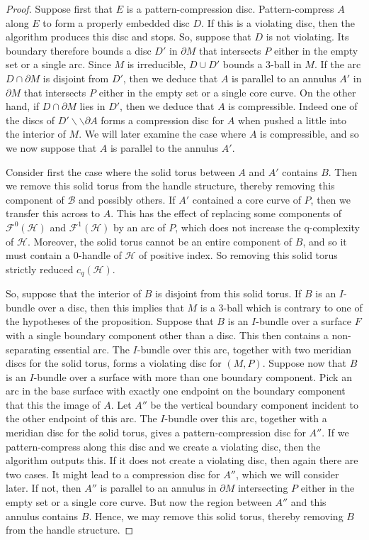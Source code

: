 \documentclass[oneside]{amsart}
\numberwithin{equation}{section}
\theoremstyle{plain}
\theoremstyle{definition}
\newcommand{\cut}{\backslash\backslash}
\begin{document}
\begin{proof}
Suppose first that $E$ is a pattern-compression disc. Pattern-compress $A$ along $E$ to form a properly embedded disc $D$. If this is a violating disc, then the algorithm produces this disc and stops. So, suppose that $D$ is not violating. Its boundary therefore bounds a disc $D'$ in $\partial M$ that intersects $P$ either in the empty set or a single arc. Since $M$ is irreducible, $D \cup D'$ bounds a 3-ball in $M$. If the arc $D \cap \partial M$ is disjoint from $D'$, then we deduce that $A$ is parallel to an annulus $A'$ in $\partial M$ that intersects $P$ either in the empty set or a single core curve. On the other hand, if $D \cap \partial M$ lies in $D'$, then we deduce that $A$ is compressible. Indeed one of the discs of $D' \cut \partial A$ forms a compression disc for $A$ when pushed a little into the interior of $M$. We will later examine the case where $A$ is compressible, and so we now suppose that $A$ is parallel to the annulus $A'$.

Consider first the case where the solid torus between $A$ and $A'$ contains $B$. Then we remove this solid torus from the handle structure, thereby removing this component of $\mathcal{B}$ and possibly others. If $A'$ contained a core curve of $P$, then we transfer this across to $A$. This has the effect of replacing some components of $\mathcal{F}^0(\mathcal{H})$ and $\mathcal{F}^1(\mathcal{H})$ by an arc of $P$, which does not increase the q-complexity of $\mathcal{H}$. Moreover, the solid torus cannot be an entire component of $B$, and so it must contain a 0-handle of $\mathcal{H}$ of positive index. So removing this solid torus strictly reduced $c_q(\mathcal{H})$.

So, suppose that the interior of $B$ is disjoint from this solid torus. If $B$ is an $I$-bundle over a disc, then this implies that $M$ is a 3-ball which is contrary to one of the hypotheses of the proposition. 
Suppose that $B$ is an $I$-bundle over a surface $F$ with a single boundary component other than a disc. This then contains a non-separating essential arc. The $I$-bundle over this arc, together with two meridian discs for the solid torus, forms a violating disc for $(M,P)$. Suppose now that $B$ is an $I$-bundle over a surface with more than one boundary component. Pick an arc in the base surface with exactly one endpoint on the boundary component that this the image of $A$. Let $A''$ be the vertical boundary component incident to the other endpoint of this arc. The $I$-bundle over this arc, together with a meridian disc for the solid torus, gives a pattern-compression disc for $A''$. If we pattern-compress along this disc and we create a violating disc, then the algorithm outputs this. If it does not create a violating disc, then again there are two cases. It might lead to a compression disc for $A''$, which we will consider later. If not, then $A''$ is parallel to an annulus in $\partial M$ intersecting $P$ either in the empty set or a single core curve. But now the region between $A''$ and this annulus contains $B$. Hence, we may remove this solid torus, thereby removing $B$ from the handle structure.


\end{proof}
\end{document}
